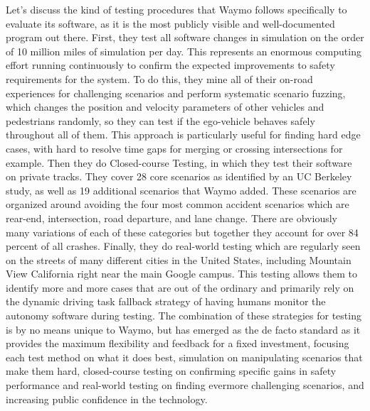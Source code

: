 Let's discuss the kind of testing procedures that Waymo follows specifically to evaluate its software, 
as it is the most publicly visible and well-documented program out there. First, they test all software changes in simulation on 
the order of 10 million miles of simulation per day. This represents an enormous computing effort running continuously 
to confirm the expected improvements to safety requirements for the system. To do this, they mine all of their on-road experiences
for challenging scenarios and perform systematic scenario fuzzing, which changes the position and velocity parameters of other vehicles 
and pedestrians randomly, so they can test if the ego-vehicle behaves safely throughout all of them. 
This approach is particularly useful for finding hard edge cases, with hard to resolve time gaps for 
merging or crossing intersections for example. 
Then they do Closed-course Testing, in which they test their software on private tracks. They cover 28 core scenarios as 
identified by an UC Berkeley study, as well as 19 additional scenarios that Waymo added. 
These scenarios are organized around avoiding the four most common accident scenarios which are rear-end, intersection, road departure, and lane change. 
There are obviously many variations of each of these categories but together they account for over 84 percent of all crashes. 
Finally, they do real-world testing which are regularly seen on the streets of many different cities in the United States, 
including Mountain View California right near the main Google campus. This testing allows them to identify more and more cases 
that are out of the ordinary and primarily rely on the dynamic driving task fallback strategy of having humans monitor the autonomy software during testing. 
The combination of these strategies for testing is by no means unique to Waymo, but has emerged as the de facto 
standard as it provides the maximum flexibility and feedback for a fixed investment, focusing each test method on what it does best, 
simulation on manipulating scenarios that make them hard, closed-course testing on confirming specific gains in safety performance 
and real-world testing on finding evermore challenging scenarios, and increasing public confidence in the technology. 


